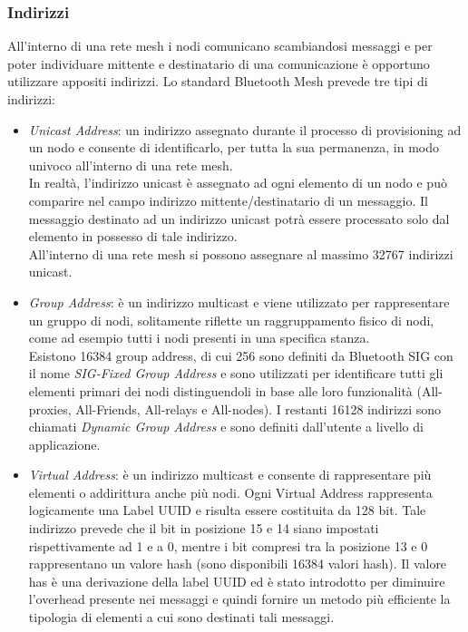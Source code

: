 \subsubsection{Indirizzi}
\label{subsub:indirizzi}
All'interno di una rete mesh i nodi comunicano scambiandosi messaggi e per poter individuare mittente e destinatario di una comunicazione è opportuno utilizzare appositi indirizzi. Lo standard Bluetooth Mesh prevede tre tipi di indirizzi:
\begin{itemize}
    \item \textit{Unicast Address}: un indirizzo assegnato durante il processo di provisioning ad un nodo e consente di identificarlo, per tutta la sua permanenza, in modo univoco all'interno di una rete mesh.\\
    In realtà, l'indirizzo unicast è assegnato ad ogni elemento di un nodo e può comparire nel campo indirizzo mittente/destinatario di un messaggio. Il messaggio destinato ad un indirizzo unicast potrà essere processato solo dal elemento in possesso di tale indirizzo.\\
    All'interno di una rete mesh si possono assegnare al massimo 32767 indirizzi unicast.
    
    \item \textit{Group Address}: è un indirizzo multicast e viene utilizzato per rappresentare un gruppo di nodi, solitamente riflette un raggruppamento fisico di nodi, come ad esempio tutti i nodi presenti in una specifica stanza. \\
    Esistono 16384 group address, di cui 256 sono definiti da Bluetooth SIG con il nome \textit{SIG-Fixed Group Address} e sono utilizzati per identificare tutti gli elementi primari dei nodi distinguendoli in base alle loro funzionalità (All-proxies, All-Friends, All-relays e All-nodes). I restanti 16128 indirizzi sono chiamati \textit{Dynamic Group Address} e sono definiti dall'utente a livello di applicazione.
        
    \item \textit{Virtual Address}: è un indirizzo multicast e consente di rappresentare più elementi o addirittura anche più nodi. Ogni Virtual Address rappresenta logicamente una Label UUID e risulta essere costituita da 128 bit. Tale indirizzo prevede che il bit in posizione 15 e 14 siano impostati rispettivamente ad 1 e a 0, mentre i bit compresi tra la posizione 13 e 0 rappresentano un valore hash (sono disponibili 16384 valori hash). Il valore has è una derivazione della label UUID ed è stato introdotto per diminuire l'overhead presente nei messaggi e quindi fornire un metodo più efficiente la tipologia di elementi a cui sono destinati tali messaggi. 
\end{itemize}

